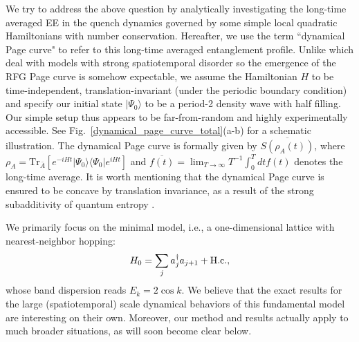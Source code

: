 \documentclass[twocolumn,english,prl,aps,superscriptaddress,amsmath,amssymb,floatfix]{revtex4-2}
\def \Tr {\mathrm{Tr}}
\begin{document}
We try to address the above question by 
analytically investigating the long-time averaged EE in the quench dynamics governed by 
some simple local quadratic Hamiltonians with number conservation. Hereafter, we use the term ``dynamical Page curve" to refer to this long-time averaged entanglement profile. 
Unlike \citep{PhysRevE.104.014146, Dias2021} which deal with models with strong spatiotemporal disorder so the emergence of the RFG Page curve is somehow expectable, we assume the Hamiltonian $H$ to be time-independent, translation-invariant (under the periodic boundary condition) and specify our initial state $|\Psi_0\rangle$ to be %
a period-2 density wave with half filling. Our simple setup thus appears to be far-from-random and highly experimentally accessible. See Fig.~\ref{dynamical_page_curve_total}(a-b) for a schematic illustration. The dynamical Page curve is %
formally given by $\overline{S(\rho_A(t))}$, where $\rho_A=\Tr_{\bar A}[e^{-iHt}|\Psi_0\rangle\langle\Psi_0|e^{iHt}]$ and $\overline{f(t)}=\lim_{T\to\infty}T^{-1}\int^T_0 dt f(t)$ denotes the long-time average. It is worth mentioning that the dynamical Page curve is ensured to be concave by translation invariance, as a result of the strong subadditivity of quantum entropy \cite{Wolf2008}. 

We primarily focus on the minimal 
model, i.e., a one-dimensional lattice with nearest-neighbor hopping:
\begin{equation}
H_{0}=\sum_{j}a_{j}^{\dagger}a_{j+1}+{\rm H.c.},
\label{eq:NNH_Hamiltonian}
\end{equation}
whose 
band dispersion reads $E_k=2\cos k$. We believe that the exact results for the large (spatiotemporal) scale dynamical behaviors of this fundamental model are interesting on their own.  Moreover, our method and results actually apply to much broader situations, as will soon become clear below. 
\end{document}
